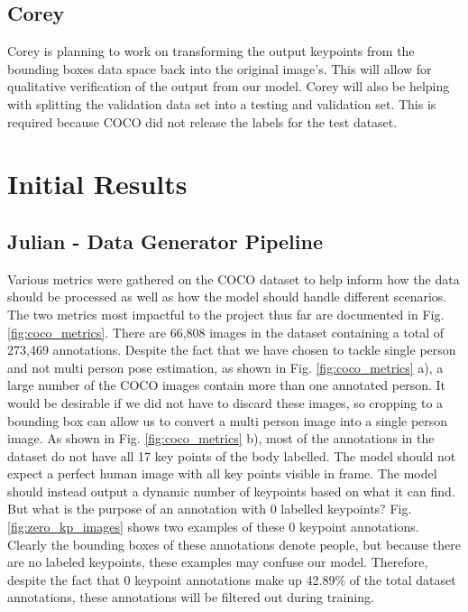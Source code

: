 \documentclass[11pt, letterpaper]{article}
\begin{document}
\subsection{Corey}
Corey is planning to work on transforming the output keypoints from the bounding boxes data space back into the original image's. This will allow for qualitative verification of the output from our model. Corey will also be helping with splitting the validation data set into a testing and validation set. This is required because COCO did not release the labels for the test dataset.

\section{Initial Results}
\label{SectionInitialResults}

\subsection{Julian - Data Generator Pipeline}

Various metrics were gathered on the COCO dataset to help inform how the data should be processed as well as how the model should handle different scenarios. The two metrics most impactful to the project thus far are documented in Fig. \ref{fig:coco_metrics}. There are 66,808 images in the dataset containing a total of 273,469 annotations. Despite the fact that we have chosen to tackle single person and not multi person pose estimation, as shown in Fig. \ref{fig:coco_metrics} a), a large number of the COCO images contain more than one annotated person. It would be desirable if we did not have to discard these images, so cropping to a bounding box can allow us to convert a multi person image into a single person image. As shown in Fig. \ref{fig:coco_metrics} b), most of the annotations in the dataset do not have all 17 key points of the body labelled. The model should not expect a perfect human image with all key points visible in frame. The model should instead output a dynamic number of keypoints based on what it can find. But what is the purpose of an annotation with 0 labelled keypoints? Fig. \ref{fig:zero_kp_images} shows two examples of these 0 keypoint annotations. Clearly the bounding boxes of these annotations denote people, but because there are no labeled keypoints, these examples may confuse our model. Therefore, despite the fact that 0 keypoint annotations make up 42.89\% of the total dataset annotations, these annotations will be filtered out during training.
\end{document}
